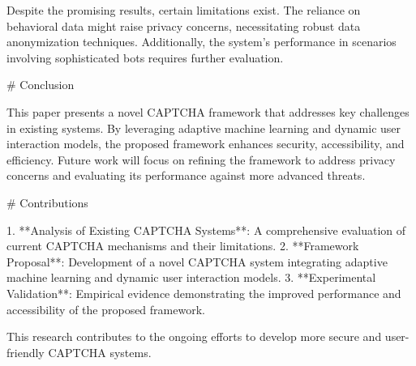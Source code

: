 Despite the promising results, certain limitations exist. The reliance on behavioral data might raise privacy concerns, necessitating robust data anonymization techniques. Additionally, the system's performance in scenarios involving sophisticated bots requires further evaluation.  

# Conclusion  

This paper presents a novel CAPTCHA framework that addresses key challenges in existing systems. By leveraging adaptive machine learning and dynamic user interaction models, the proposed framework enhances security, accessibility, and efficiency. Future work will focus on refining the framework to address privacy concerns and evaluating its performance against more advanced threats.  

# Contributions  

1. **Analysis of Existing CAPTCHA Systems**: A comprehensive evaluation of current CAPTCHA mechanisms and their limitations.  
2. **Framework Proposal**: Development of a novel CAPTCHA system integrating adaptive machine learning and dynamic user interaction models.  
3. **Experimental Validation**: Empirical evidence demonstrating the improved performance and accessibility of the proposed framework.  

This research contributes to the ongoing efforts to develop more secure and user-friendly CAPTCHA systems.